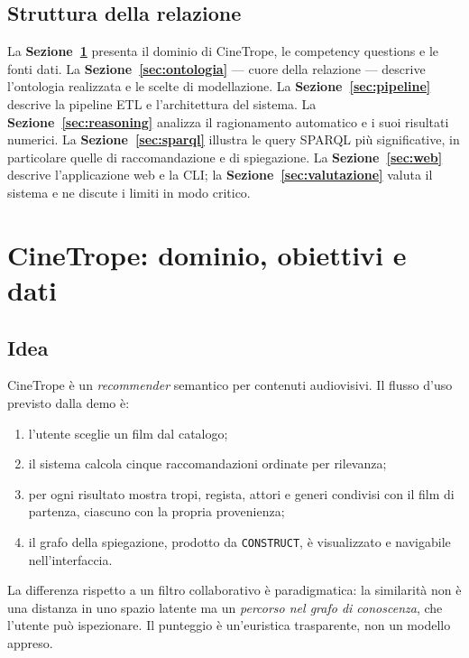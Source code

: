 \documentclass[a4paper,11pt]{article}
\newcommand{\code}[1]{\texttt{#1}}
\begin{document}
\subsection{Struttura della relazione}

La \textbf{Sezione~\ref{sec:dominio}} presenta il dominio di CineTrope, le
competency questions e le fonti dati. La
\textbf{Sezione~\ref{sec:ontologia}} --- cuore della relazione --- descrive
l'ontologia realizzata e le scelte di modellazione. La
\textbf{Sezione~\ref{sec:pipeline}} descrive la pipeline ETL e l'architettura
del sistema. La \textbf{Sezione~\ref{sec:reasoning}} analizza il ragionamento
automatico e i suoi risultati numerici. La \textbf{Sezione~\ref{sec:sparql}}
illustra le query SPARQL pi\`u significative, in particolare quelle di
raccomandazione e di spiegazione. La \textbf{Sezione~\ref{sec:web}} descrive
l'applicazione web e la CLI; la \textbf{Sezione~\ref{sec:valutazione}}
valuta il sistema e ne discute i limiti in modo critico.

\section{CineTrope: dominio, obiettivi e dati}\label{sec:dominio}

\subsection{Idea}

CineTrope \`e un \emph{recommender} semantico per contenuti audiovisivi. Il
flusso d'uso previsto dalla demo \`e:

\begin{enumerate}[nosep]
  \item l'utente sceglie un film dal catalogo;
  \item il sistema calcola cinque raccomandazioni ordinate per rilevanza;
  \item per ogni risultato mostra tropi, regista, attori e generi condivisi
        con il film di partenza, ciascuno con la propria provenienza;
  \item il grafo della spiegazione, prodotto da \code{CONSTRUCT}, \`e
        visualizzato e navigabile nell'interfaccia.
\end{enumerate}

La differenza rispetto a un filtro collaborativo \`e paradigmatica: la
similarit\`a non \`e una distanza in uno spazio latente ma un
\emph{percorso nel grafo di conoscenza}, che l'utente pu\`o ispezionare.
Il punteggio \`e un'euristica trasparente, non un modello appreso.
\end{document}
